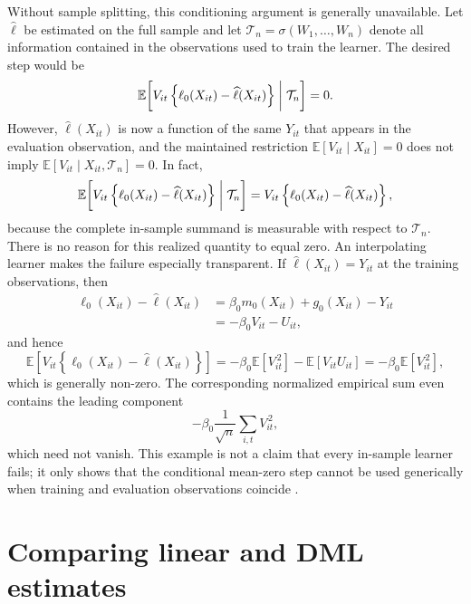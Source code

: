 \documentclass[11pt,oneside,a4paper]{book}
\newcommand{\tocsection}[2]{%
  \section[#1]{#2}%
}
\begin{document}
Without sample splitting, this conditioning argument is generally unavailable. Let \(\widehat{\ell}\) be estimated on the full sample and let \(\mathcal{T}_n=\sigma(W_1,\ldots,W_n)\) denote all information contained in the observations used to train the learner. The desired step would be
\begin{equation}
\mathbb{E}\!\left[
V_{it}
\left\{
\ell_0(X_{it})-\widehat{\ell}(X_{it})
\right\}
\biggm|\mathcal{T}_n
\right]
=0.
\label{eq:nosplit_desired_mean_zero}
\end{equation}
However, \(\widehat{\ell}(X_{it})\) is now a function of the same \(Y_{it}\) that appears in the evaluation observation, and the maintained restriction \(\mathbb{E}[V_{it}\mid X_{it}]=0\) does not imply \(\mathbb{E}[V_{it}\mid X_{it},\mathcal{T}_n]=0\). In fact,
\begin{equation*}
\mathbb{E}\!\left[
V_{it}
\left\{
\ell_0(X_{it})-\widehat{\ell}(X_{it})
\right\}
\biggm|\mathcal{T}_n
\right]
=
V_{it}
\left\{
\ell_0(X_{it})-\widehat{\ell}(X_{it})
\right\},
\end{equation*}
because the complete in-sample summand is measurable with respect to \(\mathcal{T}_n\). There is no reason for this realized quantity to equal zero. An interpolating learner makes the failure especially transparent. If \(\widehat{\ell}(X_{it})=Y_{it}\) at the training observations, then
\begin{align*}
\ell_0(X_{it})-\widehat{\ell}(X_{it})
&=
\beta_0m_0(X_{it})+g_0(X_{it})
-Y_{it} \\
&=
-\beta_0V_{it}-U_{it},
\end{align*}
and hence
\begin{equation}
\mathbb{E}\!\left[
V_{it}
\left\{
\ell_0(X_{it})-\widehat{\ell}(X_{it})
\right\}
\right]
=
-\beta_0\mathbb{E}[V_{it}^{\,2}]
-\mathbb{E}[V_{it}U_{it}]
=
-\beta_0\mathbb{E}[V_{it}^{\,2}],
\label{eq:nosplit_interpolation_bias}
\end{equation}
which is generally non-zero. The corresponding normalized empirical sum even contains the leading component
\begin{equation*}
-\beta_0
\frac{1}{\sqrt{n}}
\sum_{i,t}V_{it}^{\,2},
\end{equation*}
which need not vanish. This example is not a claim that every in-sample learner fails; it only shows that the conditional mean-zero step cannot be used generically when training and evaluation observations coincide \citep{chernozhukov2018dml}. 

\tocsection{Comparing Linear and DML Estimates}{Comparing linear and DML estimates}
\label{sec:ols_dml_comparison_method}
\end{document}
